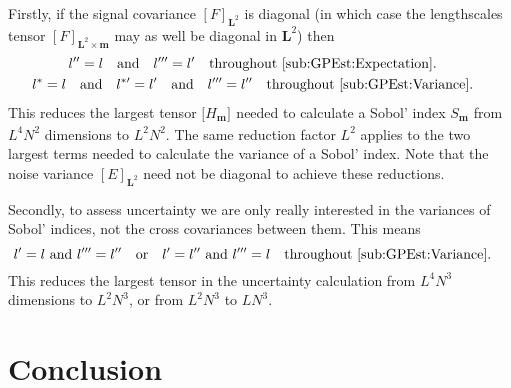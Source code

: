 \documentclass[preprint,12pt]{elsarticle}
\newcommand*{\M}[1]{\ensuremath{#1}\xspace}
\newcommand*{\x}{\times}
\newcommand*{\mi}[1]{\mathbf{#1}}
\newcommand*{\te}[2][]{\left\lbrack{#2}\right\rbrack_{#1}}
\newcommand*{\tte}[2][]{\lbrack{#2}\rbrack_{#1}}
\newcommand{\T}[1]{\text{#1}}
\newcommand*{\QT}[2][]{\M{\quad\T{#2}\ifthenelse{\equal{#1}{}}{\quad}{#1}}}
\begin{document}
        Firstly, if the signal covariance $\te[\mi{L}^{2}]{F}$ is diagonal (in which case the lengthscales tensor $\te[\mi{L}^{2}\x\mi{m}]{F}$ may as well be diagonal in $\mi{L}^{2}$) then
        \begin{gather*}
            l^{\prime\prime} = l \QT{and} l^{\prime\prime\prime} = l^{\prime} \QT{throughout \cref{sub:GPEst:Expectation}.}  \\ 
            l^{*} = l \QT{and} l^{*\prime} = l^{\prime} \QT{and} l^{\prime\prime\prime} = l^{\prime\prime} \QT{throughout \cref{sub:GPEst:Variance}.}
        \end{gather*}
        This reduces the largest tensor $\tte[]{H_{\mi{m}}}$ needed to calculate a Sobol' index $S_{\mi{m}}$ from $L^{4}N^{2}$ dimensions to $L^{2}N^{2}$. The same reduction factor $L^{2}$ applies to the two largest terms needed to calculate the variance of a Sobol' index. Note that the noise variance $\te[\mi{L}^{2}]{E}$ need not be diagonal to achieve these reductions.

        Secondly, to assess uncertainty we are only really interested in the variances of Sobol' indices, not the cross covariances between them. This means
        \begin{equation*}
            l^{\prime} = l \T{ and } l^{\prime\prime\prime} = l^{\prime\prime} \QT{or} 
            l^{\prime} = l^{\prime\prime} \T{ and } l^{\prime\prime\prime} = l \QT{throughout \cref{sub:GPEst:Variance}.}   
        \end{equation*}
        This reduces the largest tensor in the uncertainty calculation from $L^{4}N^{3}$ dimensions to $L^{2}N^{3}$, or from $L^{2}N^{3}$ to $LN^{3}$.


\section{Conclusion}\label{sec:Conc}




 

\end{document}
